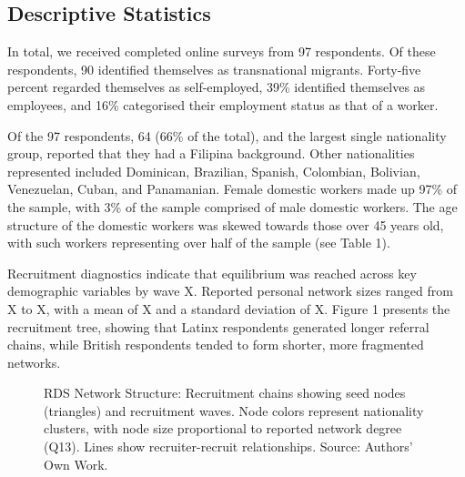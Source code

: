 \documentclass[
  12pt,
  letterpaper,
  DIV=11,
  numbers=noendperiod]{scrartcl}
\theoremstyle{plain}
\theoremstyle{definition}
\begin{document}
\subsection{Descriptive Statistics}\label{descriptive-statistics}

In total, we received completed online surveys from 97 respondents. Of
these respondents, 90 identified themselves as transnational migrants.
Forty-five percent regarded themselves as self-employed, 39\% identified
themselves as employees, and 16\% categorised their employment status as
that of a worker.

Of the 97 respondents, 64 (66\% of the total), and the largest single
nationality group, reported that they had a Filipina background. Other
nationalities represented included Dominican, Brazilian, Spanish,
Colombian, Bolivian, Venezuelan, Cuban, and Panamanian. Female domestic
workers made up 97\% of the sample, with 3\% of the sample comprised of
male domestic workers. The age structure of the domestic workers was
skewed towards those over 45 years old, with such workers representing
over half of the sample (see Table 1).

Recruitment diagnostics indicate that equilibrium was reached across key
demographic variables by wave X. Reported personal network sizes ranged
from X to X, with a mean of X and a standard deviation of X. Figure 1
presents the recruitment tree, showing that Latinx respondents generated
longer referral chains, while British respondents tended to form
shorter, more fragmented networks.

\begin{figure}[H]


\caption{\label{fig-rds-network}RDS Network Structure: Recruitment
chains showing seed nodes (triangles) and recruitment waves. Node colors
represent nationality clusters, with node size proportional to reported
network degree (Q13). Lines show recruiter-recruit relationships.
Source: Authors' Own Work.}

\end{figure}%
\end{document}
